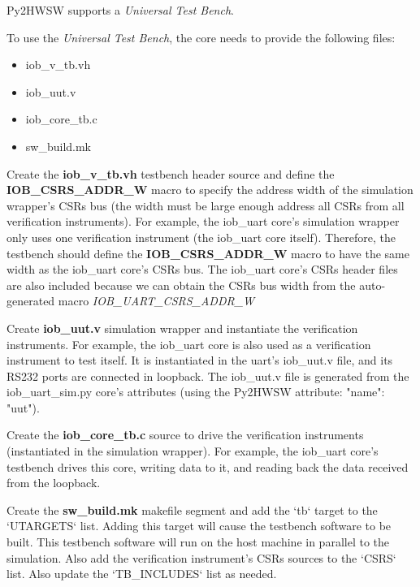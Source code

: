%

Py2HWSW supports a \textit{Universal Test Bench}.

To use the \textit{Universal Test Bench}, the core needs to provide the following files:
\begin{itemize}
  \item iob\_v\_tb.vh
  \item iob\_uut.v
  \item iob\_core\_tb.c
  \item sw\_build.mk
\end{itemize}


Create the \textbf{iob\_v\_tb.vh} testbench header source and define the \textbf{IOB\_CSRS\_ADDR\_W} macro to specify the address width of the simulation wrapper's CSRs bus (the width must be large enough address all CSRs from all verification instruments).
For example, the iob\_uart core's simulation wrapper only uses one verification instrument (the iob\_uart core itself). Therefore, the testbench should define the \textbf{IOB\_CSRS\_ADDR\_W} macro to have the same width as the iob\_uart core's CSRs bus.
The iob\_uart core's CSRs header files are also included because we can obtain the CSRs bus width from the auto-generated macro \textit{IOB\_UART\_CSRS\_ADDR\_W}


Create \textbf{iob\_uut.v} simulation wrapper and instantiate the verification instruments.
For example, the iob\_uart core is also used as a verification instrument to test itself. It is instantiated in the uart's iob\_uut.v file, and its RS232 ports are connected in loopback. The iob\_uut.v file is generated from the iob\_uart\_sim.py core's attributes (using the Py2HWSW attribute: "name": "uut").


Create the \textbf{iob\_core\_tb.c} source to drive the verification instruments (instantiated in the simulation wrapper).
For example, the iob\_uart core's testbench drives this core, writing data to it, and reading back the data received from the loopback.

Create the \textbf{sw\_build.mk} makefile segment and add the `tb` target to the `UTARGETS` list. Adding this target will cause the testbench software to be built. This testbench software will run on the host machine in parallel to the simulation.
Also add the verification instrument's CSRs sources to the `CSRS` list.
Also update the `TB\_INCLUDES` list as needed.
